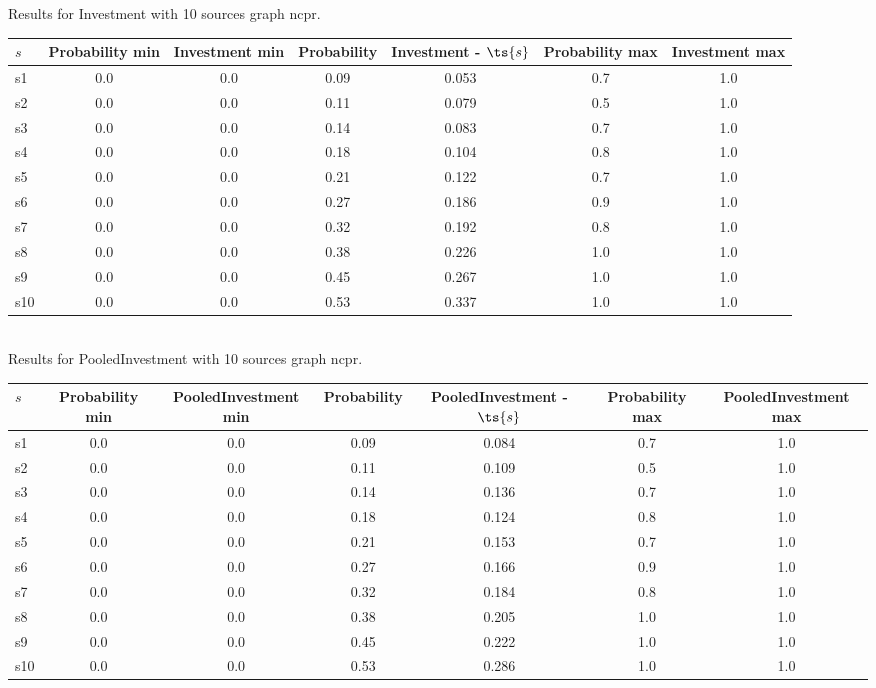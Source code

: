 \documentclass{article}
\begin{document}
\noindent Results for Investment with 10 sources graph ncpr.

\noindent\begin{tabular}{|l|c|c|c|c|c|c|}
\hline
$s$& Probability min & Investment min & Probability & Investment - $\ts{s}$ & Probability max & Investment max\\
\hline
s1 &0.0 & 0.0 & 0.09 & 0.053 & 0.7 & 1.0\\
\hline
s2 &0.0 & 0.0 & 0.11 & 0.079 & 0.5 & 1.0\\
\hline
s3 &0.0 & 0.0 & 0.14 & 0.083 & 0.7 & 1.0\\
\hline
s4 &0.0 & 0.0 & 0.18 & 0.104 & 0.8 & 1.0\\
\hline
s5 &0.0 & 0.0 & 0.21 & 0.122 & 0.7 & 1.0\\
\hline
s6 &0.0 & 0.0 & 0.27 & 0.186 & 0.9 & 1.0\\
\hline
s7 &0.0 & 0.0 & 0.32 & 0.192 & 0.8 & 1.0\\
\hline
s8 &0.0 & 0.0 & 0.38 & 0.226 & 1.0 & 1.0\\
\hline
s9 &0.0 & 0.0 & 0.45 & 0.267 & 1.0 & 1.0\\
\hline
s10 &0.0 & 0.0 & 0.53 & 0.337 & 1.0 & 1.0\\
\hline
\end{tabular}\\

\noindent Results for PooledInvestment with 10 sources graph ncpr.

\noindent\begin{tabular}{|l|c|c|c|c|c|c|}
\hline
$s$& Probability min & PooledInvestment min & Probability & PooledInvestment - $\ts{s}$ & Probability max & PooledInvestment max\\
\hline
s1 &0.0 & 0.0 & 0.09 & 0.084 & 0.7 & 1.0\\
\hline
s2 &0.0 & 0.0 & 0.11 & 0.109 & 0.5 & 1.0\\
\hline
s3 &0.0 & 0.0 & 0.14 & 0.136 & 0.7 & 1.0\\
\hline
s4 &0.0 & 0.0 & 0.18 & 0.124 & 0.8 & 1.0\\
\hline
s5 &0.0 & 0.0 & 0.21 & 0.153 & 0.7 & 1.0\\
\hline
s6 &0.0 & 0.0 & 0.27 & 0.166 & 0.9 & 1.0\\
\hline
s7 &0.0 & 0.0 & 0.32 & 0.184 & 0.8 & 1.0\\
\hline
s8 &0.0 & 0.0 & 0.38 & 0.205 & 1.0 & 1.0\\
\hline
s9 &0.0 & 0.0 & 0.45 & 0.222 & 1.0 & 1.0\\
\hline
s10 &0.0 & 0.0 & 0.53 & 0.286 & 1.0 & 1.0\\
\hline
\end{tabular}\\
\end{document}
